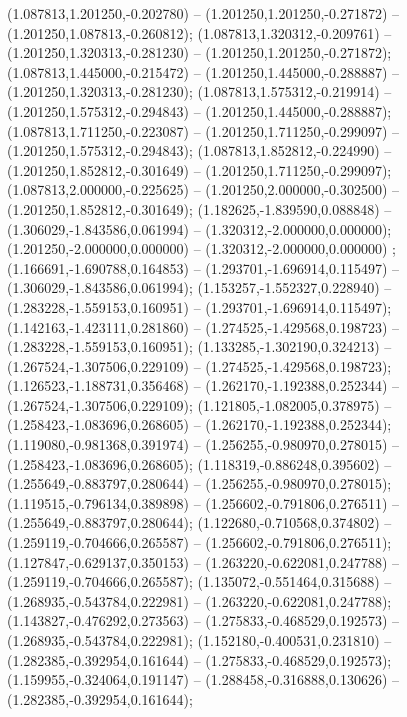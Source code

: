  (1.087813,1.201250,-0.202780) -- (1.201250,1.201250,-0.271872) -- (1.201250,1.087813,-0.260812);
 (1.087813,1.320312,-0.209761) -- (1.201250,1.320313,-0.281230) -- (1.201250,1.201250,-0.271872);
 (1.087813,1.445000,-0.215472) -- (1.201250,1.445000,-0.288887) -- (1.201250,1.320313,-0.281230);
 (1.087813,1.575312,-0.219914) -- (1.201250,1.575312,-0.294843) -- (1.201250,1.445000,-0.288887);
 (1.087813,1.711250,-0.223087) -- (1.201250,1.711250,-0.299097) -- (1.201250,1.575312,-0.294843);
 (1.087813,1.852812,-0.224990) -- (1.201250,1.852812,-0.301649) -- (1.201250,1.711250,-0.299097);
 (1.087813,2.000000,-0.225625) -- (1.201250,2.000000,-0.302500) -- (1.201250,1.852812,-0.301649);
 (1.182625,-1.839590,0.088848) -- (1.306029,-1.843586,0.061994) -- (1.320312,-2.000000,0.000000);
 (1.201250,-2.000000,0.000000) -- (1.320312,-2.000000,0.000000) ;
 (1.166691,-1.690788,0.164853) -- (1.293701,-1.696914,0.115497) -- (1.306029,-1.843586,0.061994);
 (1.153257,-1.552327,0.228940) -- (1.283228,-1.559153,0.160951) -- (1.293701,-1.696914,0.115497);
 (1.142163,-1.423111,0.281860) -- (1.274525,-1.429568,0.198723) -- (1.283228,-1.559153,0.160951);
 (1.133285,-1.302190,0.324213) -- (1.267524,-1.307506,0.229109) -- (1.274525,-1.429568,0.198723);
 (1.126523,-1.188731,0.356468) -- (1.262170,-1.192388,0.252344) -- (1.267524,-1.307506,0.229109);
 (1.121805,-1.082005,0.378975) -- (1.258423,-1.083696,0.268605) -- (1.262170,-1.192388,0.252344);
 (1.119080,-0.981368,0.391974) -- (1.256255,-0.980970,0.278015) -- (1.258423,-1.083696,0.268605);
 (1.118319,-0.886248,0.395602) -- (1.255649,-0.883797,0.280644) -- (1.256255,-0.980970,0.278015);
 (1.119515,-0.796134,0.389898) -- (1.256602,-0.791806,0.276511) -- (1.255649,-0.883797,0.280644);
 (1.122680,-0.710568,0.374802) -- (1.259119,-0.704666,0.265587) -- (1.256602,-0.791806,0.276511);
 (1.127847,-0.629137,0.350153) -- (1.263220,-0.622081,0.247788) -- (1.259119,-0.704666,0.265587);
 (1.135072,-0.551464,0.315688) -- (1.268935,-0.543784,0.222981) -- (1.263220,-0.622081,0.247788);
 (1.143827,-0.476292,0.273563) -- (1.275833,-0.468529,0.192573) -- (1.268935,-0.543784,0.222981);
 (1.152180,-0.400531,0.231810) -- (1.282385,-0.392954,0.161644) -- (1.275833,-0.468529,0.192573);
 (1.159955,-0.324064,0.191147) -- (1.288458,-0.316888,0.130626) -- (1.282385,-0.392954,0.161644);
